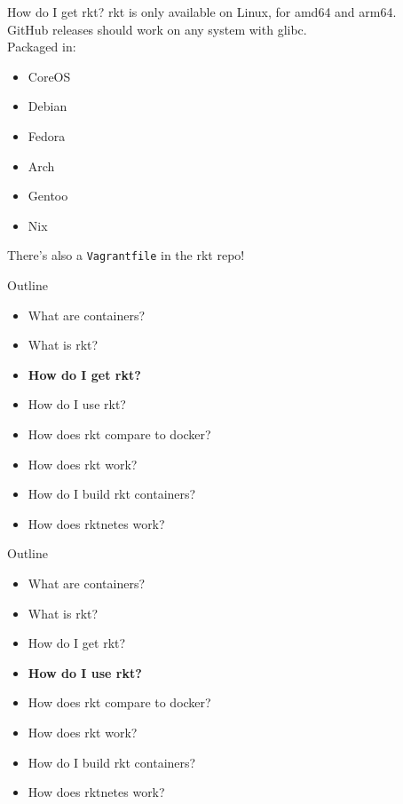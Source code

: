 \documentclass[pdf,aspectratio=169,14pt]{beamer}
\begin{document}
\begin{frame}{How do I get rkt?}
    rkt is only available on Linux, for amd64 and arm64. \\
    GitHub releases should work on any system with glibc. \\
    \pause
    \vspace{1em}
    Packaged in:
    \begin{itemize}
        \item CoreOS
        \item Debian
        \item Fedora
        \item Arch
        \item Gentoo
        \item Nix
    \end{itemize}
    \pause
    There's also a \texttt{Vagrantfile} in the rkt repo!
\end{frame}


\begin{frame}
    Outline
    \begin{itemize}
        \item What are containers?
        \item What is rkt?
        \item \textbf{How do I get rkt?}
        \item How do I use rkt?
        \item How does rkt compare to docker?
        \item How does rkt work?
        \item How do I build rkt containers?
        \item How does rktnetes work?
    \end{itemize}
\end{frame}

\begin{frame}
    Outline
    \begin{itemize}
        \item What are containers?
        \item What is rkt?
        \item How do I get rkt?
        \item \textbf{How do I use rkt?}
        \item How does rkt compare to docker?
        \item How does rkt work?
        \item How do I build rkt containers?
        \item How does rktnetes work?
    \end{itemize}
\end{frame}
\end{document}
